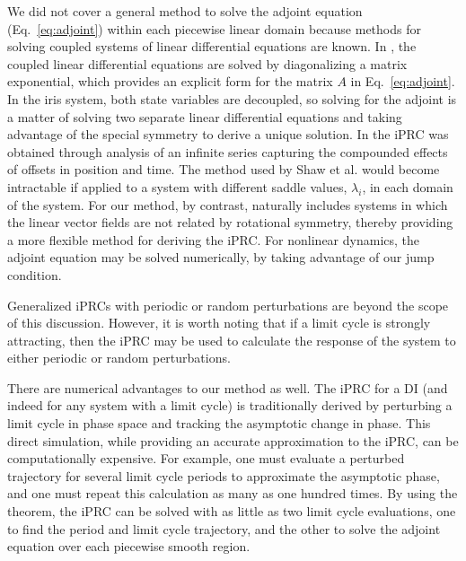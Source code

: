\documentclass[12pt]{article}
\begin{document}
We did not cover a general method to solve the adjoint equation (Eq.~\ref{eq:adjoint}) within each piecewise linear domain because methods for solving coupled systems of linear differential equations are known.  In \cite{Coombes:2008:SIADS}, the coupled linear differential equations are solved by diagonalizing a matrix exponential, which provides an explicit form for the matrix $A$ in Eq.~\eqref{eq:adjoint}.  In the iris system, both state variables are decoupled, so solving for the adjoint is a matter of solving two separate linear differential equations and taking advantage of the special symmetry to derive a unique solution.  In \cite{ShawParkChielThomas2012SIADS} the iPRC was obtained through analysis of an infinite series capturing the compounded effects of offsets in position and time.  The method used by Shaw et al. would become intractable if applied to a system with different saddle values, $\lambda_i$, in each domain of the system.  For our method, by contrast, naturally includes systems in which the linear vector fields are not related by rotational symmetry, thereby providing a more flexible method for deriving the iPRC. For nonlinear dynamics, the adjoint equation may be solved numerically, by taking advantage of our jump condition.

Generalized iPRCs with periodic or random perturbations are beyond the scope of this discussion.  However, it is worth noting that if a limit cycle is strongly attracting, then the iPRC may be used to calculate the response of the system to either periodic or random perturbations.


There are numerical advantages to our method as well.  The iPRC for a DI (and indeed for any system with a limit cycle) is traditionally derived by perturbing a limit cycle in phase space and tracking the asymptotic change in phase.  This direct simulation, while providing an accurate approximation to the iPRC, can be computationally expensive.  For example, one must evaluate a perturbed trajectory for several limit cycle periods to approximate the asymptotic phase, and one must repeat this calculation as many as one hundred times.  By using the theorem, the iPRC can be solved with as little as two limit cycle evaluations, one to find the period and limit cycle trajectory, and the other to solve the adjoint equation over each piecewise smooth region.
\end{document}

